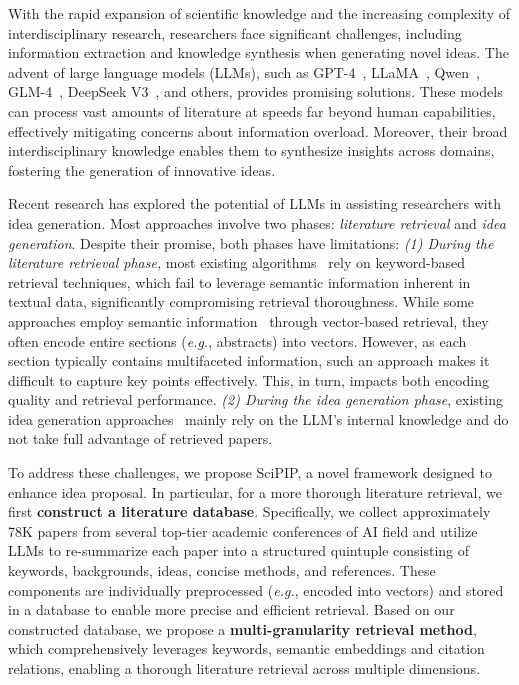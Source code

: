 \documentclass{article}
\theoremstyle{plain}
\theoremstyle{definition}
\theoremstyle{remark}
\newcommand\eg{\textit{e.g.}}
\begin{document}
With the rapid expansion of scientific knowledge and the increasing complexity of interdisciplinary research, researchers face significant challenges, including information extraction and knowledge synthesis when generating novel ideas. The advent of large language models (LLMs), such as GPT-4~\citep{DBLP:conf/nips/Ouyang0JAWMZASR22}, LLaMA~\citep{DBLP:journals/corr/abs-2302-13971,DBLP:journals/corr/abs-2307-09288}, Qwen~\citep{DBLP:journals/corr/abs-2309-16609,DBLP:journals/corr/abs-2407-10671}, GLM-4~\citep{DBLP:journals/corr/abs-2406-12793}, DeepSeek V3~\cite{DBLP:journals/corr/abs-2412-19437}, and others, provides promising solutions. These models can process vast amounts of literature at speeds far beyond human capabilities, effectively mitigating concerns about information overload. Moreover, their broad interdisciplinary knowledge enables them to synthesize insights across domains, fostering the generation of innovative ideas.

Recent research has explored the potential of LLMs in assisting researchers with idea generation. Most approaches involve two phases: \textit{literature retrieval} and \textit{idea generation}. Despite their promise, both phases have limitations:
\textit{(1) During the literature retrieval phase,} most existing algorithms~\citep{DBLP:journals/corr/abs-2408-06292,DBLP:journals/corr/abs-2409-14634} rely on keyword-based retrieval techniques, which fail to leverage semantic information inherent in textual data, significantly compromising retrieval thoroughness. While some approaches employ semantic information~\citep{DBLP:journals/corr/abs-2410-09403,DBLP:conf/acl/XuSXFWZ23} through vector-based retrieval, they often encode entire sections (\eg, abstracts) into vectors. However, as each section typically contains multifaceted information, such an approach makes it difficult to capture key points effectively. This, in turn, impacts both encoding quality and retrieval performance.
\textit{(2) During the idea generation phase}, 
existing idea generation approaches~\citep{DBLP:journals/corr/abs-2408-06292,DBLP:journals/corr/abs-2404-07738,DBLP:conf/acl/0005DJH24} mainly rely on the LLM's internal knowledge and do not take full advantage of retrieved papers.

To address these challenges, we propose SciPIP, a novel framework designed to enhance idea proposal. In particular, for a more thorough literature retrieval, we first \textbf{construct a literature database}. Specifically, we collect approximately 78K papers from several top-tier academic conferences of AI field and utilize LLMs to re-summarize each paper into a structured quintuple consisting of keywords, backgrounds, ideas, concise methods, and references. These components are individually preprocessed (\eg, encoded into vectors) and stored in a database to enable more precise and efficient retrieval. Based on our constructed database, we propose a \textbf{multi-granularity retrieval method}, which comprehensively leverages keywords, semantic embeddings and citation relations, enabling a thorough literature retrieval across multiple dimensions.
\end{document}
